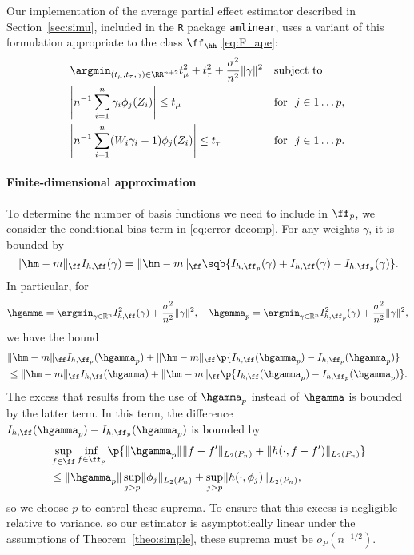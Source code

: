 Our implementation of the average partial effect estimator described in Section~\ref{sec:simu},  included in the
\texttt{R} package \texttt{amlinear}, uses a variant of this formulation appropriate to the class
$\ff_{\hh}$ \eqref{eq:F_ape}:
\begin{align*}
&\argmin_{(t_{\mu},t_{\tau}, \gamma) \in \RR^{n+2}} t_{\mu}^2+t_{\tau}^2 + \frac{\sigma^2}{n^2}\norm{\gamma}^2 && \text{subject to}\ \\
& \abs*{n^{-1}\sum_{i=1}^n \gamma_i \phi_j(Z_i) } \le t_{\mu} && \text{for }\ j \in 1 \ldots p, \\
& \abs*{n^{-1}\sum_{i=1}^n (W_i \gamma_i - 1) \phi_j(Z_i) } \le t_{\tau} && \text{for }\ j \in 1 \ldots p.
\end{align*} 

\paragraph*{Finite-dimensional approximation}
To determine the number of basis functions we need to include in $\ff_p$, 
we consider the conditional bias term in \eqref{eq:error-decomp}. For any weights $\gamma$, it is bounded by 
\[ \norm{\hm - m}_{\ff}I_{h,\ff}(\gamma) = \norm{\hm - m}_{\ff}\sqb{ I_{h,\ff_p}(\gamma) + I_{h,\ff}(\gamma) - I_{h,\ff_p}(\gamma)}. \]
In particular, for 
\[ \hgamma  = \argmin_{\gamma \in \R^n} I_{h,\ff}^2(\gamma) + \frac{\sigma^2}{n^2}\norm{\gamma}^2,\quad
   \hgamma_p = \argmin_{\gamma \in \R^n} I_{h,\ff_p}^2(\gamma) + \frac{\sigma^2}{n^2}\norm{\gamma}^2, \]
we have the bound
\begin{align*} 
&\norm{\hm - m}_{\ff} I_{h,\ff_p}(\hgamma_p) + \norm{\hm - m}_{\ff}\p{I_{h,\ff}(\hgamma_p) - I_{h,\ff_p}(\hgamma_p)} \\
&\le \norm{\hm - m}_{\ff} I_{h,\ff}(\hgamma) + \norm{\hm - m}_{\ff}\p{I_{h,\ff}(\hgamma_p) - I_{h,\ff_p}(\hgamma_p)}.
\end{align*}
The excess that results from the use of $\hgamma_p$ instead of $\hgamma$ is bounded by the latter term. In this term, the difference 
$I_{h,\ff}(\hgamma_p) - I_{h,\ff_p}(\hgamma_p)$ is bounded by 
\begin{align*} 
&\sup_{f \in \ff}\inf_{f \in \ff_p}\p{\norm{\hgamma_p}\norm{f-f'}_{L_2(\Pn)} + \norm{h(\cdot,f-f')}_{L_2(\Pn)}} \\
&\le \norm{\hgamma_p}\sup_{j > p}\norm{\phi_j}_{L_2(\Pn)} + \sup_{j > p}\norm{h(\cdot,\phi_j)}_{L_2(\Pn)},
\end{align*}
so we choose $p$ to control these suprema. To ensure that this excess is negligible relative to variance, so our estimator is
asymptotically linear under the assumptions of Theorem~\ref{theo:simple}, these suprema must be $o_P(n^{-1/2})$.

